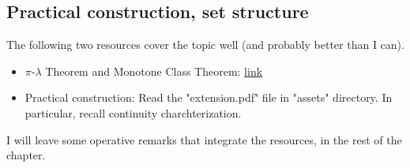 \subsection{Practical construction, set structure}

The following two resources cover the topic well (and probably better than I can).
\begin{itemize}
	\item $\pi$-$\lambda$ Theorem and Monotone Class Theorem: \href{https://almostsuremath.com/2019/10/06/the-monotone-class-theorem/}{link}
	\item Practical construction: Read the "extension.pdf" file in "assets" directory. In particular, recall continuity charchterization.
\end{itemize}
I will leave some operative remarks that integrate the resources, in the rest of the chapter.



